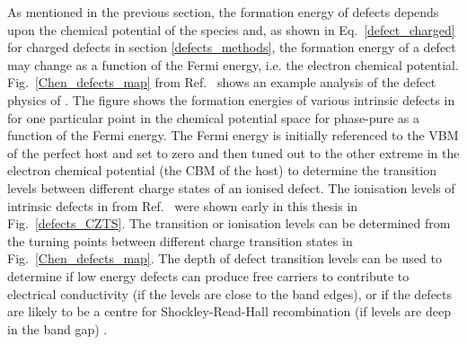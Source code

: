 \documentclass[11pt, twoside]{report}
\begin{document}
As mentioned in the previous section, the formation energy of defects depends upon the chemical potential of the species and, as shown in Eq.~\ref{defect_charged} for charged defects in section \ref{defects_methods}, the formation energy of a defect may change as a function of the Fermi energy, i.e. the electron chemical potential.
Fig.~\ref{Chen_defects_map} from Ref.~\cite{defects_Chen_large} shows an example analysis of the defect physics of {\CZTS}. The figure shows the formation energies of various intrinsic defects in {\CZTS} for one particular point in the chemical potential space for phase-pure {\CZTS} as a function of the Fermi energy.
The Fermi energy is initially referenced to the VBM of the perfect host and set to zero and then tuned out to the other extreme in the electron chemical potential (the CBM of the host) to determine the transition levels between different charge states of an ionised defect.
The ionisation levels of intrinsic defects in {\CZTS} from Ref.~ were shown early in this thesis in Fig.~\ref{defects_CZTS}. The transition or ionisation levels can be determined from the turning points between different charge transition states in Fig.~\ref{Chen_defects_map}. The depth of defect transition levels can be used to determine if low energy defects can produce free carriers to contribute to electrical conductivity (if the levels are close to the band edges), or if the defects are likely to be a centre for Shockley-Read-Hall recombination (if levels are deep in the band gap) \cite{Aron_defect_tolerance}.
\end{document}
